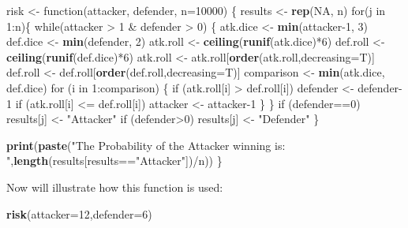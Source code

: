 \documentclass[]{book}
\newenvironment{Shaded}{\begin{snugshade}}{\end{snugshade}}
\newcommand{\KeywordTok}[1]{\textcolor[rgb]{0.13,0.29,0.53}{\textbf{{#1}}}}
\newcommand{\DataTypeTok}[1]{\textcolor[rgb]{0.13,0.29,0.53}{{#1}}}
\newcommand{\DecValTok}[1]{\textcolor[rgb]{0.00,0.00,0.81}{{#1}}}
\newcommand{\StringTok}[1]{\textcolor[rgb]{0.31,0.60,0.02}{{#1}}}
\newcommand{\OtherTok}[1]{\textcolor[rgb]{0.56,0.35,0.01}{{#1}}}
\newcommand{\NormalTok}[1]{{#1}}
\begin{document}
\begin{Shaded}
\begin{Highlighting}[]
\NormalTok{risk <-}\StringTok{ }\NormalTok{function(attacker, defender, }\DataTypeTok{n=}\DecValTok{10000}\NormalTok{) \{}
  \NormalTok{results <-}\StringTok{ }\KeywordTok{rep}\NormalTok{(}\OtherTok{NA}\NormalTok{, n)}
\NormalTok{for(j in }\DecValTok{1}\NormalTok{:n)\{}
\NormalTok{while(attacker >}\StringTok{ }\DecValTok{1} \NormalTok{&}\StringTok{ }\NormalTok{defender >}\StringTok{ }\DecValTok{0}\NormalTok{) \{}
 \NormalTok{atk.dice <-}\StringTok{ }\KeywordTok{min}\NormalTok{(attacker}\DecValTok{-1}\NormalTok{, }\DecValTok{3}\NormalTok{)}
 \NormalTok{def.dice <-}\StringTok{ }\KeywordTok{min}\NormalTok{(defender, }\DecValTok{2}\NormalTok{)}
 \NormalTok{atk.roll <-}\StringTok{ }\KeywordTok{ceiling}\NormalTok{(}\KeywordTok{runif}\NormalTok{(atk.dice)*}\DecValTok{6}\NormalTok{)}
 \NormalTok{def.roll <-}\StringTok{ }\KeywordTok{ceiling}\NormalTok{(}\KeywordTok{runif}\NormalTok{(def.dice)*}\DecValTok{6}\NormalTok{)}
 \NormalTok{atk.roll <-}\StringTok{ }\NormalTok{atk.roll[}\KeywordTok{order}\NormalTok{(atk.roll,}\DataTypeTok{decreasing=}\NormalTok{T)]}
 \NormalTok{def.roll <-}\StringTok{ }\NormalTok{def.roll[}\KeywordTok{order}\NormalTok{(def.roll,}\DataTypeTok{decreasing=}\NormalTok{T)]}
 \NormalTok{comparison <-}\StringTok{ }\KeywordTok{min}\NormalTok{(atk.dice, def.dice)}
 \NormalTok{for (i in }\DecValTok{1}\NormalTok{:comparison) \{}
  \NormalTok{if (atk.roll[i] >}\StringTok{ }\NormalTok{def.roll[i]) defender <-}\StringTok{ }\NormalTok{defender}\DecValTok{-1}
  \NormalTok{if (atk.roll[i] <=}\StringTok{ }\NormalTok{def.roll[i]) attacker <-}\StringTok{ }\NormalTok{attacker}\DecValTok{-1}
 \NormalTok{\}}
\NormalTok{\}}
\NormalTok{if (defender==}\DecValTok{0}\NormalTok{) results[j] <-}\StringTok{ "Attacker"}
\NormalTok{if (defender>}\DecValTok{0}\NormalTok{) results[j] <-}\StringTok{ "Defender"}
\NormalTok{\}}

\KeywordTok{print}\NormalTok{(}\KeywordTok{paste}\NormalTok{(}\StringTok{"The Probability of the Attacker winning is: "}\NormalTok{,}\KeywordTok{length}\NormalTok{(results[results==}\StringTok{"Attacker"}\NormalTok{])/n))}
\NormalTok{\}}
\end{Highlighting}
\end{Shaded}

Now will illustrate how this function is used:

\begin{Shaded}
\begin{Highlighting}[]
\KeywordTok{risk}\NormalTok{(}\DataTypeTok{attacker=}\DecValTok{12}\NormalTok{,}\DataTypeTok{defender=}\DecValTok{6}\NormalTok{)}
\end{Highlighting}
\end{Shaded}
\end{document}
